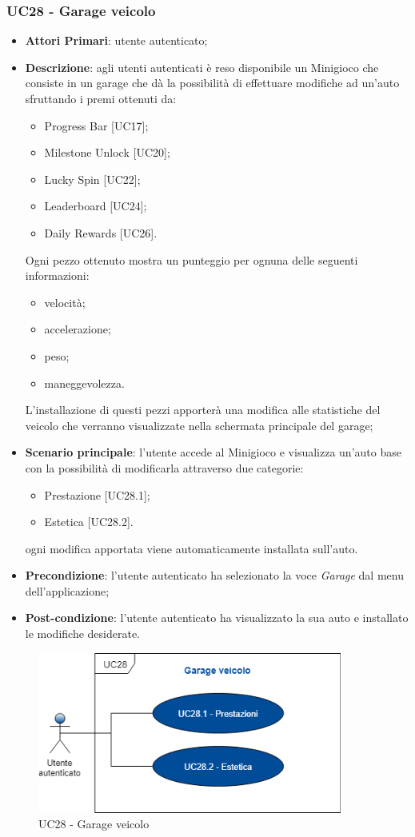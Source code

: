 \subsubsection{UC28 - Garage veicolo}
\begin{itemize}
	\item \textbf{Attori Primari}: utente autenticato;
	\item \textbf{Descrizione}: agli utenti autenticati è reso disponibile un Minigioco che consiste in un garage che dà la possibilità di effettuare modifiche ad un'auto sfruttando i premi ottenuti da:
	\begin{itemize}
		\item Progress Bar [UC17];
		\item Milestone Unlock [UC20];
		\item Lucky Spin [UC22];
		\item Leaderboard [UC24];
		\item Daily Rewards [UC26]. 
	\end{itemize} 
	Ogni pezzo ottenuto mostra un punteggio per ognuna delle seguenti informazioni:
	\begin{itemize}
		\item velocità;
		\item accelerazione;
		\item peso;
		\item maneggevolezza.
	\end{itemize}
	L'installazione di questi pezzi apporterà una modifica alle statistiche del veicolo che verranno visualizzate nella schermata principale del garage;
	\item \textbf{Scenario principale}: l'utente accede al Minigioco e visualizza un'auto base con la possibilità di modificarla attraverso due categorie:
	\begin{itemize}
		\item Prestazione [UC28.1];
		\item Estetica [UC28.2].
	\end{itemize}
	ogni modifica apportata viene automaticamente installata sull'auto.
	\item \textbf{Precondizione}: l'utente autenticato ha selezionato la voce \textit{Garage} dal menu dell'applicazione;
	\item \textbf{Post-condizione}: l'utente autenticato ha visualizzato la sua auto e installato le modifiche desiderate. 
\end{itemize}
\begin{figure}[h]
	\includegraphics[width=10cm]{res/images/UC26-Garage.png}
	\centering
	\caption{UC28 - Garage veicolo}
\end{figure}
\newpage
